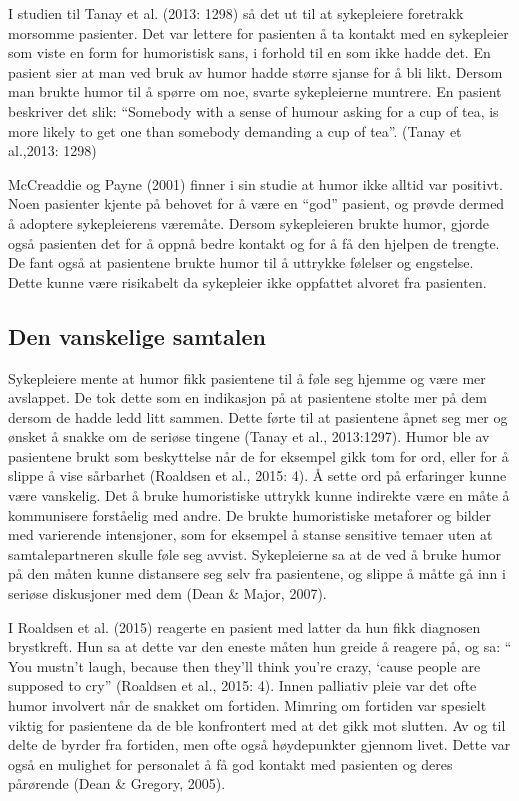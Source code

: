 I studien til Tanay et al. (2013: 1298) så det ut til at sykepleiere foretrakk
morsomme pasienter. Det var lettere for pasienten å ta kontakt med en
sykepleier som viste en form for humoristisk sans, i forhold til en som ikke
hadde det. En pasient sier at man ved bruk av humor hadde større sjanse for å
bli likt. Dersom man brukte humor til å spørre om noe, svarte sykepleierne
muntrere. En pasient beskriver det slik: “Somebody with a sense of humour
asking for a cup of tea, is more likely to get one than somebody demanding a
cup of tea”. (Tanay et al.,2013: 1298)

McCreaddie og Payne (2001) finner i sin studie at humor ikke alltid var
positivt. Noen pasienter kjente på behovet for å være en “god” pasient, og
prøvde dermed å adoptere sykepleierens væremåte. Dersom sykepleieren brukte
humor, gjorde også pasienten det for å oppnå bedre kontakt og for å få den
hjelpen de trengte. De fant også at pasientene brukte humor til å uttrykke
følelser og engstelse. Dette kunne være risikabelt da sykepleier ikke oppfattet
alvoret fra pasienten.

\subsection{Den vanskelige samtalen}

Sykepleiere mente at humor fikk pasientene til å føle seg hjemme og være mer
avslappet. De tok dette som en indikasjon på at pasientene stolte mer på dem
dersom de hadde ledd litt sammen. Dette førte til at pasientene åpnet seg mer
og ønsket å snakke om de seriøse tingene (Tanay et al., 2013:1297).  Humor ble
av pasientene brukt som beskyttelse når de for eksempel gikk tom for ord, eller
for å slippe å vise sårbarhet (Roaldsen et al., 2015: 4). Å sette ord på
erfaringer kunne være vanskelig. Det å bruke humoristiske uttrykk kunne
indirekte være en måte å kommunisere forståelig med andre. De brukte
humoristiske metaforer og bilder med varierende intensjoner, som for eksempel å
stanse sensitive temaer uten at samtalepartneren skulle føle seg avvist.
Sykepleierne sa at de ved å bruke humor på den måten kunne distansere seg selv
fra pasientene, og slippe å måtte gå inn i seriøse diskusjoner med dem (Dean \&
Major, 2007).

I Roaldsen et al. (2015) reagerte en pasient med latter da hun fikk diagnosen
brystkreft. Hun sa at dette var den eneste måten hun greide å reagere på, og
sa: “ You mustn’t laugh, because then they’ll think you’re crazy, ‘cause people
are supposed to cry” (Roaldsen et al., 2015: 4).  Innen palliativ pleie var det
ofte humor involvert når de snakket om fortiden. Mimring om fortiden var
spesielt viktig for pasientene da de ble konfrontert med at det gikk mot
slutten. Av og til delte de byrder fra fortiden, men ofte også høydepunkter
gjennom livet. Dette var også en mulighet for personalet å få god kontakt med
pasienten og deres pårørende (Dean \&{} Gregory, 2005).

